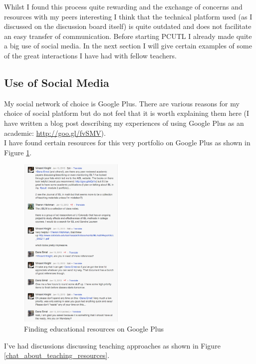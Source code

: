 \documentclass[a4paper,12pt]{article}
\begin{document}
Whilst I found this process quite rewarding and the exchange of concerns and resources with my peers interesting I think that the technical platform used (as I discussed on the discussion board itself) is quite outdated and does not facilitate an easy transfer of communication. Before starting PCUTL I already made quite a big use of social media. In the next section I will give certain examples of some of the great interactions I have had with fellow teachers.\\

\subsection{Use of Social Media}

My social network of choice is Google Plus. There are various reasons for my choice of social platform but do not feel that it is worth explaining them here (I have written a blog post describing my experiences of using Google Plus as an academic: \url{http://goo.gl/fvSMV}).\\

I have found certain resources for this very portfolio on Google Plus as shown in Figure \ref{finding_paper_on_G+}.\\

\begin{figure}[htdp]
    \begin{center}
        \includegraphics[width=5cm]{images/finding_paper_on_G+.png}
    \end{center}
    \caption{Finding educational resources on Google Plus}
    \label{finding_paper_on_G+}
\end{figure}

I've had discussions discussing teaching approaches as shown in Figure \ref{chat_about_teaching_resources}.\\
\end{document}
